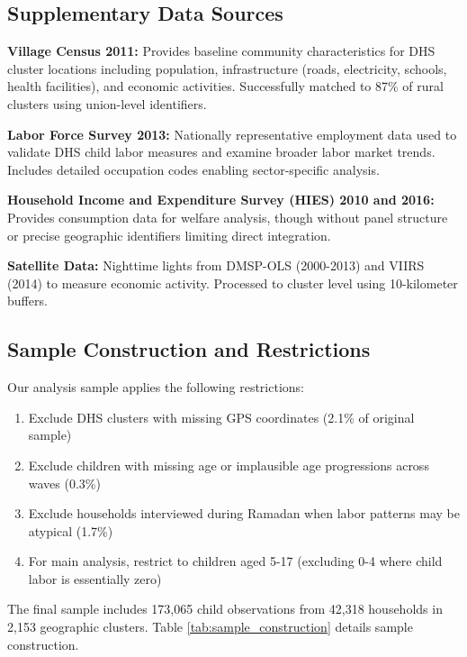 \documentclass[12pt]{article}
\begin{document}
\subsection{Supplementary Data Sources}

\textbf{Village Census 2011:} Provides baseline community characteristics for DHS cluster locations including population, infrastructure (roads, electricity, schools, health facilities), and economic activities. Successfully matched to 87\% of rural clusters using union-level identifiers.

\textbf{Labor Force Survey 2013:} Nationally representative employment data used to validate DHS child labor measures and examine broader labor market trends. Includes detailed occupation codes enabling sector-specific analysis.

\textbf{Household Income and Expenditure Survey (HIES) 2010 and 2016:} Provides consumption data for welfare analysis, though without panel structure or precise geographic identifiers limiting direct integration.

\textbf{Satellite Data:} Nighttime lights from DMSP-OLS (2000-2013) and VIIRS (2014) to measure economic activity. Processed to cluster level using 10-kilometer buffers.

\subsection{Sample Construction and Restrictions}

Our analysis sample applies the following restrictions:

\begin{enumerate}
\item Exclude DHS clusters with missing GPS coordinates (2.1\% of original sample)
\item Exclude children with missing age or implausible age progressions across waves (0.3\%)
\item Exclude households interviewed during Ramadan when labor patterns may be atypical (1.7\%)
\item For main analysis, restrict to children aged 5-17 (excluding 0-4 where child labor is essentially zero)
\end{enumerate}

The final sample includes 173,065 child observations from 42,318 households in 2,153 geographic clusters. Table \ref{tab:sample_construction} details sample construction.
\end{document}
